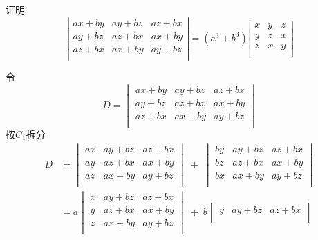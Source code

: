 \begin{questions}
    \question 证明
    \[
    \left|
    \begin{matrix}
    ax + by & ay + bz & az + bx \\
    ay + bz & az + bx & ax + by \\
    az + bx & ax + by & ay + bz \\
    \end{matrix}
    \right|
    =
    \left(a^3 + b^3\right)
    \left|
    \begin{matrix}
    x & y & z \\
    y & z & x \\
    z & x & y \\
    \end{matrix}
    \right|
    \]
    \begin{solution}
        令\[
        D=\begin{vmatrix}
        ax + by & ay + bz & az + bx \\
        ay + bz & az + bx & ax + by \\
        az + bx & ax + by & ay + bz \\
        \end{vmatrix}
        \]
        按$C_1$拆分
        \begin{align*}
            D&=\begin{vmatrix}
            ax  & ay + bz & az + bx \\
            ay  & az + bx & ax + by \\
            az  & ax + by & ay + bz \\
            \end{vmatrix} \;+\;       
            \begin{vmatrix}
            by & ay + bz & az + bx \\
            bz & az + bx & ax + by \\
            bx & ax + by & ay + bz \\
            \end{vmatrix}\\
            &= a\begin{vmatrix}
            x  & ay + bz & az + bx \\
            y  & az + bx & ax + by \\
            z  & ax + by & ay + bz \\
            \end{vmatrix} \;+\;b       
            \begin{vmatrix}
            y & ay + bz & az + bx \\

\end{vmatrix}
\end{align*}
\end{solution}
\end{questions}
